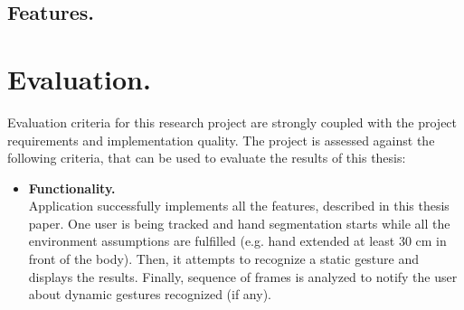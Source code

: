 \documentclass[a4paper,11pt,oneside]{article}
\begin{document}
\subsection{Features.}

 
 \section{Evaluation.}
  
 Evaluation criteria for this research project are strongly coupled with the project requirements and implementation quality. The project is assessed against the following criteria, that can be used to evaluate the results of this thesis:

  \begin{itemize}
  \item \textbf{Functionality.} \\
Application successfully implements all the features, described in this thesis paper. One user is being tracked and hand segmentation starts while all the environment assumptions are fulfilled (e.g. hand extended at least 30 cm in front of the body). Then, it attempts to recognize a static gesture and displays the results. Finally, sequence of frames is analyzed to notify the user about dynamic gestures recognized (if any).


\end{itemize}
\end{document}

